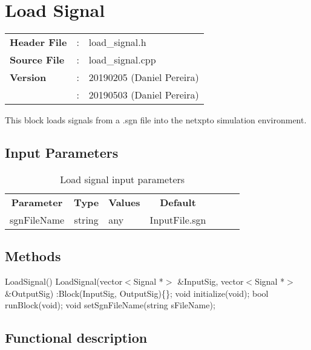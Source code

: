\clearpage

\section{Load Signal}

\begin{tcolorbox}	
	\begin{tabular}{p{2.75cm} p{0.2cm} p{10.5cm}} 	
		\textbf{Header File}   &:& load\_signal.h \\
		\textbf{Source File}   &:& load\_signal.cpp \\
        \textbf{Version}       &:& 20190205 (Daniel Pereira)\\
        &:& 20190503 (Daniel Pereira)
	\end{tabular}
\end{tcolorbox}

This block loads signals from a .sgn file into the netxpto simulation environment.

\subsection*{Input Parameters}

\begin{table}[h]
	\centering
	\begin{tabular}{|c|c|p{60mm}|c|ccc}
		\cline{1-4}
		\textbf{Parameter} & \textbf{Type}   & \textbf{Values} &   \textbf{Default}  \\ \cline{1-4}
		sgnFileName        & string          & any             & InputFile.sgn       \\ \cline{1-4}
	\end{tabular}
	\caption{Load signal input parameters} 
	\label{table:LoadSignal_in_par}
\end{table}

\subsection*{Methods}

LoadSignal() {}
\bigbreak
LoadSignal(vector$<$Signal *$>$ \&InputSig, vector$<$Signal *$>$ \&OutputSig) :Block(InputSig, OutputSig)\{\};
\bigbreak
void initialize(void);
\bigbreak
bool runBlock(void);
\bigbreak
void setSgnFileName(string sFileName);

\subsection*{Functional description}

